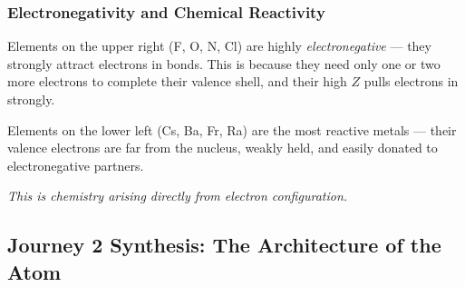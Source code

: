 \documentclass[12pt, a4paper]{book}
\newcommand{\newterm}[1]{\textit{\textcolor{DiscoveryColor}{#1}}}
\begin{document}
\subsubsection{Electronegativity and Chemical Reactivity}

Elements on the upper right (F, O, N, Cl) are highly
\newterm{electronegative} --- they strongly attract electrons
in bonds.
This is because they need only one or two more electrons
to complete their valence shell, and their high $Z$ pulls
electrons in strongly.

Elements on the lower left (Cs, Ba, Fr, Ra) are the most reactive
metals --- their valence electrons are far from the nucleus,
weakly held, and easily donated to electronegative partners.

\emph{This is chemistry arising directly from electron configuration.}

\subsection*{Journey 2 Synthesis: The Architecture of the Atom}
\end{document}
